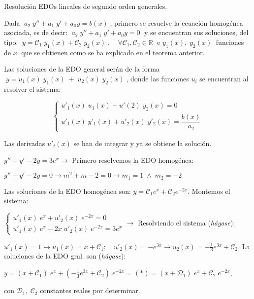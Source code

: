 \begin{cuadro-naranja}
\begin{teor}{Resolución EDOs lineales de segundo orden generales.}

Dada $\; a_2\; y'' + a_1	\; y' + a_0 y= b(x)\; $, primero se resuelve la ecuación homogénea asociada, es de decir: $\; a_2\; y'' + a_1	\; y' + a_0 y= 0 \; $ y se encuentran sus soluciones, del tipo: $\; y=\mathcal{C}_1\; y_1(x) +\mathcal{C}_2\; y_2(x)\; , \quad \forall \mathcal{C}_1,\mathcal{C}_2 \in \mathbb R\; $ e $y_1(x),\; y_2(x)\; $ funciones de $x$.  que se obtienen como se ha explicado en el teorema anterior.

Las soluciones de la EDO general serán de la forma $\; y= u_1(x)\; y_1(x) \; + \; u_2(x)\; y_2(x)\; $, donde las funciones $u_i$ se encuentran al resolver el sistema:

\begin{equation*}
	\begin{cases}
	u'_1(x)\; u_1(x) + u'(2)\; y_2(x)=0 \\
	u'_1(x)\; y'_1(x) + u'_2(x)\; y'_2(x)= \dfrac {b(x)}{a_2}	
	\end{cases}	
\end{equation*}

Las derivadas $u'_i(x)$ se han de integrar y ya se obtiene la solución.	
\end{teor}
\end{cuadro-naranja}

\vspace{4mm}

\begin{cuadro-gris}
\begin{ejem}
$y''+y'-2y=3e^x \to $ Primero resolvemos la EDO homogénea: 

$y''+y'-2y=0 \to m^2+m-2=0 \to m_1=1 \; \wedge \; m_2=-2 $

Las soluciones de la EDO homogénea son:  $y=\mathcal{C}_1 e^x + \mathcal{C}_2 e^{-2x}$. Montemos el sistema:

$\begin{cases}
u'_1(x)\; e^x + u'_2(x)\; e^{-2x}=0 \\
u'_1(x)\; e^x - 2x \; u'_2(x)\; e^{-2x}= 3e^x	
\end{cases} \to $ Resolviendo el sistema (\emph{hágase}):

$u'_1(x)=1 \to u_1(x)=x + \mathcal{C}_1 ; \quad u'_2(x)=-e^{3x} \to u_2(x)=-\frac 1 3 e^{3x}+\mathcal{C}_2$. La soluciones de la EDO gral. son (\emph{hágase}):

\hspace{20mm} $y=\left( x+\mathcal{C}_1 \right)\; e^x + \left( -\frac 1 3 e^{3x} + \mathcal{C}_2 \right) \; e^{-2x}=(*)= (x+\mathcal{D}_1) \; e^x + \mathcal{C}_2\; e^{-2x}$, 

con $\mathcal{D}_1, \; \mathcal{C}_2$ constantes reales por determinar.

	
\end{ejem}
\end{cuadro-gris}

